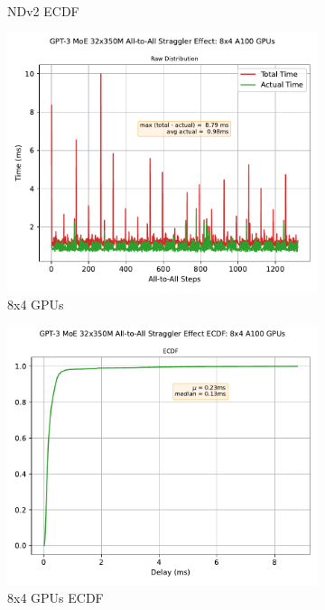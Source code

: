 \begin{figure}[!ht]
\begin{subfigure}{.5\linewidth}
        \caption{NDv2 ECDF}
        \label{sub:s_350_ecdf}
    \end{subfigure}
    \medskip %
    \begin{subfigure}{.5\linewidth}
        \centering
        \includegraphics[width=0.8\linewidth]{images/GPT-3_MoE_32x350M}
        \caption{8x4 GPUs}
        \label{sub:m_350}
    \end{subfigure}\hfill %
    \begin{subfigure}{.5\linewidth}
        \centering
        \includegraphics[width=0.8\linewidth, keepaspectratio]{images/GPT-3_MoE_32x350M_ecdf}
        \caption{8x4 GPUs ECDF}
        \label{sub:m_350_ecdf}
    \end{subfigure}
    \medskip %
    \begin{subfigure}{.5\linewidth}

\end{subfigure}
\end{figure}
